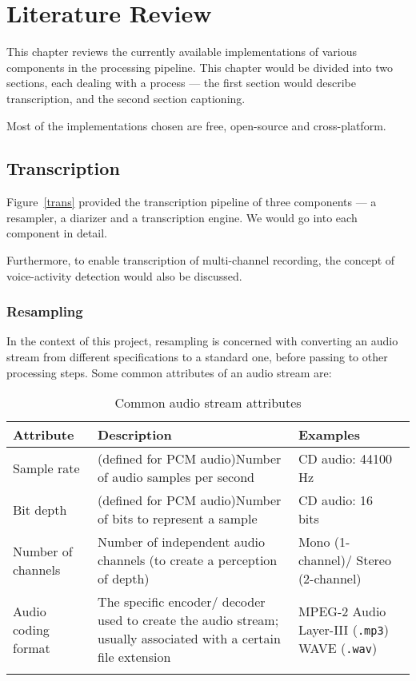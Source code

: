 \chapter{Literature Review}

This chapter reviews the currently available implementations of various
components in the processing pipeline. This chapter would be divided into
two sections, each dealing with a process --- the first section would
describe transcription, and the second section captioning.

Most of the implementations chosen are free, open-source and cross-platform.

\section{Transcription}

Figure~\ref{trans} provided the transcription pipeline of three components
--- a resampler, a diarizer and a transcription engine. We would go into
each component in detail.

Furthermore, to enable transcription of multi-channel recording, the concept
of voice-activity detection would also be discussed.

\subsection{Resampling}

In the context of this project, resampling is concerned with converting an
audio stream from different specifications to a standard one, before passing to
other processing steps. Some common attributes of an audio stream are:

\begin{longtabu}{X[1.5,l]X[4]X[2.5]}
    \textbf{Attribute} & \textbf{Description} & \textbf{Examples} \\
    \midrule
    \endhead{}
    Sample rate &
    (defined for PCM audio)\newline Number of audio samples per
    second~\cite{weik1995communications} &
    CD audio: 44100 Hz~\cite{sample-rate} \\
    Bit depth &
    (defined for PCM audio)\newline Number of bits to represent
    a sample~\cite{thompson2005understanding} &
    CD audio: 16 bits~\cite{iec60908} \\
    Number of channels &
    Number of independent audio channels (to create a
    perception of depth) &
    Mono (1-channel)/\newline
    Stereo (2-channel)\cite{mono-stereo} \\
    Audio coding format &
    The specific encoder/ decoder used to create the audio stream;
    usually associated with a certain file extension &
    MPEG-2 Audio Layer-III (\texttt{.mp3})~\cite{mp3}\newline
    WAVE (\texttt{.wav})~\cite{wav} \\
    \caption{Common audio stream attributes}
\end{longtabu}


